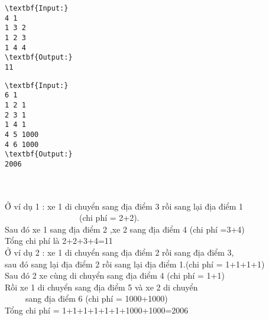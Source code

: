 \begin{verbatim}
\textbf{Input:} 
4 1
1 3 2
1 2 3
1 4 4
\textbf{Output:}
11
\end{verbatim}
\begin{verbatim}
\textbf{Input:} 
6 1
1 2 1
2 3 1
1 4 1
4 5 1000
4 6 1000
\textbf{Output:}
2006\end{verbatim}


\\
\\Ở ví dụ 1 : xe 1 di chuyển sang địa điểm 3 rồi sang lại địa điểm 1
\\                  (chi phí = 2+2).
\\Sau đó xe 1 sang địa điểm 2 ,xe 2 sang địa điểm 4 (chi phí =3+4)
\\Tổng chi phí là 2+2+3+4=11
\\Ở ví dụ 2 : xe 1 di chuyển sang địa điểm 2 rồi sang địa điểm 3,
\\sau đó sang lại địa điểm 2 rồi sang lại địa điểm 1.(chi phí = 1+1+1+1)
\\Sau đó 2 xe cùng di chuyển sang địa điểm 4 (chi phí = 1+1)
\\Rồi xe 1 di chuyển sang địa điểm 5 và xe 2 di chuyển
\\     sang địa điểm 6 (chi phí = 1000+1000)
\\Tổng chi phí = 1+1+1+1+1+1+1000+1000=2006
\\
\\ 

 